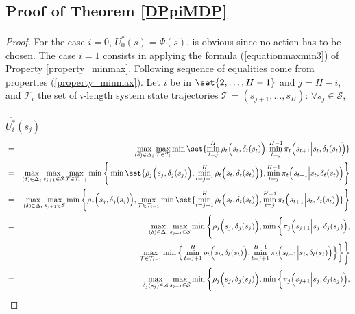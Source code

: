 \subsection{Proof of Theorem \ref{DPpiMDP}}
\label{DPpiMDP_RETURN}
\begin{proof}
For the case $i=0$, 
$\overline{U_0^*}(s) = \Psi(s)$, is obvious since no action has to be chosen.
The case $i=1$ consists in applying the formula (\ref{equationmaxmin3}) of Property \ref{property_minmax}.
Following sequence of equalities come from properties (\ref{property_minmax}). 
Let $i$ be in $\set{2, \ldots, H-1}$ and $j=H-i$, 
and $\mathcal{T}_i$ the set of $i$-length system state trajectories $\mathcal{T} = (s_{j+1},\ldots,s_H)$: 
$\forall s_j \in \mathcal{S}$,\\
\\
$\overline{U^*_i}(s_j)$
\vspace{-0.5cm}
\begin{eqnarray}
\nonumber  & = & \displaystyle \max_{(\delta) \in \Delta_i} \max_{\mathcal{T} \in \mathcal{T}_i} \min \set{ \min_{t=j}^{H} \rho_t\Big(s_t,\delta_t(s_t)\Big), \min_{t=j}^{H-1} \pi_t \Big(s_{t+1} \Big\vert s_t , \delta_t(s_t) \Big) } \\
\nonumber & = &  \displaystyle \max_{(\delta) \in \Delta_i} \max_{s_{j+1} \in \mathcal{S}} \max_{\mathcal{T} \in \mathcal{T}_{i-1}} \min \Bigg\{ \min \set{ \rho_{j} \Big( s_{j},\delta_{j}(s_{j}) \Big), \min_{t=j+1}^{H} \rho_{t} \Big(s_t,\delta_t(s_t)\Big)}, \min_{t=j}^{H-1} \pi_t \Big( s_{t+1} \Big\vert s_t , \delta_t(s_t) \Big) \Bigg\} \\
\nonumber & = &  \displaystyle \max_{(\delta) \in \Delta_i} \max_{s_{j+1} \in \mathcal{S}} \min \Bigg\{ \rho_j \Big( s_j,\delta_j(s_j) \Big), \max_{\mathcal{T} \in \mathcal{T}_{i-1}} \min \set{  \min_{t=j+1}^{H} \rho_t \Big(s_t,\delta_t(s_t) \Big), \min_{t=j}^{H-1} \pi_t \Big(s_{t+1} \Big\vert s_t , \delta_t(s_t) \Big) } \Bigg\} \\
\nonumber & = &  \displaystyle \max_{(\delta) \in \Delta_i} \max_{s_{j+1} \in \mathcal{S}} \min \Bigg\{ \rho_j \Big( s_j,\delta_j(s_j) \Big), \min \bigg\{ \pi_j \Big( s_{j+1} \Big\vert s_j, \delta_j(s_j) \Big), \\ 
\nonumber & & \hspace{5cm} \max_{\mathcal{T} \in \mathcal{T}_{i-1}} \min \Big\{  \min_{t=j+1}^{H} \rho_t \Big( s_t,\delta_t(s_t) \Big), \min_{t=j+1}^{H-1} \pi_t \Big( s_{t+1} \Big\vert s_t , \delta_t(s_t) \Big) \Big\} \bigg\} \Bigg\} \\
\nonumber & = &  \displaystyle \max_{\delta_j(s_j) \in \mathcal{A}} \max_{s_{j+1} \in \mathcal{S}} \min \Bigg\{ \rho_j \Big( s_j,\delta_j(s_j) \Big), \min \bigg\{ \pi_j \Big( s_{j+1} \Big\vert s_j, \delta_j(s_j) \Big), \\ 

\end{eqnarray}
\end{proof}
